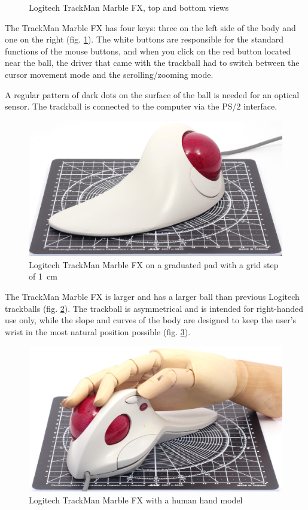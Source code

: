 \documentclass[11pt, a4paper]{article}
\begin{document}
\begin{figure}[h]
    \caption{Logitech TrackMan Marble FX, top and bottom views}
    \label{fig:trackmanTopAndBottom}
\end{figure}

The TrackMan Marble FX has four keys: three on the left side of the body and one on the right (fig. \ref{fig:trackmanTopAndBottom}).
The white buttons are responsible for the standard functions of the mouse buttons, and when you click on the red button located near the ball, the driver that came with the trackball had to switch between the cursor movement mode and the scrolling/zooming mode.

A regular pattern of dark dots on the surface of the ball is needed for an optical sensor. The trackball is connected to the computer via the PS/2 interface.

\begin{figure}[h]
    \centering
    \includegraphics[scale=0.4]{1998_logitech_trackman_marble_fx/size_30.jpg}
    \caption{Logitech TrackMan Marble FX on a graduated pad with a grid step of 1~cm}
    \label{fig:trackmanSize}
\end{figure}

The TrackMan Marble FX is larger and has a larger ball than previous Logitech trackballs (fig. \ref{fig:trackmanSize}). The trackball is asymmetrical and is intended for right-handed use only, while the slope and curves of the body are designed to keep the user's wrist in the most natural position possible (fig. \ref{fig:trackmanHand}).

\begin{figure}[h]
    \centering
    \includegraphics[scale=0.6]{1998_logitech_trackman_marble_fx/hand_30.jpg}
    \caption{Logitech TrackMan Marble FX with a human hand model}
    \label{fig:trackmanHand}
\end{figure}
\end{document}
